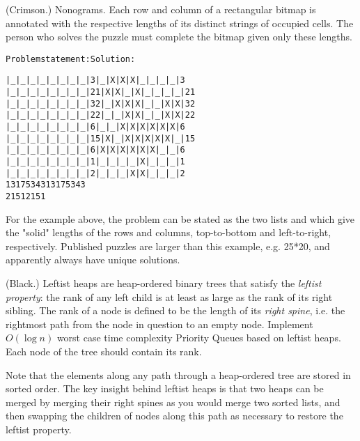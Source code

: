 \documentclass{article}
\newcommand{\tmem}[1]{{\em #1\/}}
\newcommand{\tmverbatim}[1]{\text{{\ttfamily{#1}}}}
\newenvironment{tmcode}[1][]{\begin{alltt} }{\end{alltt}}
{\theorembodyfont{\rmfamily\small}\newtheorem{exercise}{Exercise}}
\begin{document}
\begin{exercise}
  (Crimson.) Nonograms. Each row and column of a rectangular bitmap is
  annotated with the respective lengths of its distinct strings of occupied
  cells. The person who solves the puzzle must complete the bitmap given only
  these lengths.
  \begin{tmcode}
            Problem statement:          Solution:

          |_|_|_|_|_|_|_|_| 3         |_|X|X|X|_|_|_|_| 3
          |_|_|_|_|_|_|_|_| 2 1       |X|X|_|X|_|_|_|_| 2 1
          |_|_|_|_|_|_|_|_| 3 2       |_|X|X|X|_|_|X|X| 3 2
          |_|_|_|_|_|_|_|_| 2 2       |_|_|X|X|_|_|X|X| 2 2
          |_|_|_|_|_|_|_|_| 6         |_|_|X|X|X|X|X|X| 6
          |_|_|_|_|_|_|_|_| 1 5       |X|_|X|X|X|X|X|_| 1 5
          |_|_|_|_|_|_|_|_| 6         |X|X|X|X|X|X|_|_| 6
          |_|_|_|_|_|_|_|_| 1         |_|_|_|_|X|_|_|_| 1
          |_|_|_|_|_|_|_|_| 2         |_|_|_|X|X|_|_|_| 2
           1 3 1 7 5 3 4 3             1 3 1 7 5 3 4 3
           2 1 5 1                     2 1 5 1
  \end{tmcode}
  For the example above, the problem can be stated as the two lists
  \tmverbatim{[[3];[2;1];[3;2];[2;2];[6];[1;5];[6];[1];[2]]} and
  \tmverbatim{[[1;2];[3;1];[1;5];[7;1];[5];[3];[4];[3]]} which give the
  "solid" lengths of the rows and columns, top-to-bottom and left-to-right,
  respectively. Published puzzles are larger than this example, e.g. 25*20,
  and apparently always have unique solutions.
\end{exercise}

\begin{exercise}
  (Black.) Leftist heaps are heap-ordered binary trees that satisfy the
  {\tmem{leftist property}}: the rank of any left child is at least as large
  as the rank of its right sibling. The rank of a node is defined to be the
  length of its {\tmem{right spine}}, i.e. the rightmost path from the node in
  question to an empty node. Implement $O (\log n)$ worst case time complexity
  Priority Queues based on leftist heaps. Each node of the tree should contain
  its rank.
  
  Note that the elements along any path through a heap-ordered tree are stored
  in sorted order. The key insight behind leftist heaps is that two heaps can
  be merged by merging their right spines as you would merge two sorted lists,
  and then swapping the children of nodes along this path as necessary to
  restore the leftist property.
\end{exercise}

\
\end{document}
